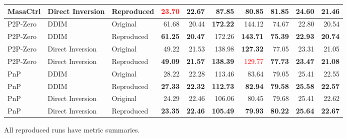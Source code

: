 \documentclass[11pt]{article}
\begin{document}
\begin{table}[htbp]
{\begin{tabular}{lllrrrrrrr}
    MasaCtrl & Direct Inversion & Reproduced & \textcolor{red}{\textbf{23.70}} & \textbf{22.67} & \textbf{87.85} & \textbf{80.85} & \textbf{81.85} & \textbf{24.60} & \textbf{21.46} \\
    \midrule
    P2P-Zero & DDIM & Original & 61.68 & 20.44 & \textbf{172.22} & 144.12 & 74.67 & 22.80 & 20.54 \\
    P2P-Zero & DDIM & Reproduced & \textbf{61.25} & \textbf{20.47} & 172.26 & \textbf{143.71} & \textbf{75.39} & \textbf{22.93} & \textbf{20.74} \\
    P2P-Zero & Direct Inversion & Original & 49.22 & 21.53 & 138.98 & \textbf{127.32} & 77.05 & 23.31 & 21.05 \\
    P2P-Zero & Direct Inversion & Reproduced & \textbf{49.09} & \textbf{21.57} & \textbf{138.39} & \textcolor{red}{129.77} & \textbf{77.73} & \textbf{23.47} & \textbf{21.08} \\
    \midrule
    PnP & DDIM & Original & 28.22 & 22.28 & 113.46 & 83.64 & 79.05 & 25.41 & 22.55 \\
    PnP & DDIM & Reproduced & \textbf{27.33} & \textbf{22.32} & \textbf{112.73} & \textbf{82.94} & \textbf{79.58} & \textbf{25.58} & \textbf{22.57} \\
    PnP & Direct Inversion & Original & 24.29 & 22.46 & 106.06 & 80.45 & 79.68 & 25.41 & 22.62 \\
    PnP & Direct Inversion & Reproduced & \textbf{23.35} & \textbf{22.46} & \textbf{105.49} & \textbf{79.93} & \textbf{80.22} & \textbf{25.64} & \textbf{22.67} \\
    \bottomrule
  \end{tabular}
  }
\end{table}

\noindent All reproduced runs have metric summaries.
\end{document}
